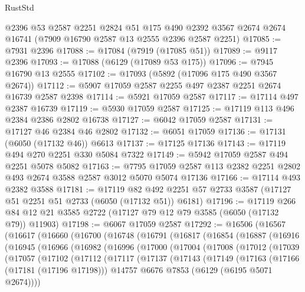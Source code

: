 \begin{lexlean}{RustStd}
\begin{coremodule}
    @2396
    @53
    @2587
    @2251
    @2824
    @51
    @175
    @490
    @2392
    @3567
    @2674
    @2674
    @16741
    (@7909 @16790 @2587 @13 @2555 @2396 @2587 @2251)
@17085 := @7931 @2396
@17088 := @17084 (@7919 (@17085 @51))
@17089 := @9117 @2396
@17093 := @17088 (@6129 (@17089 @53 @175))
@17096 := @7945 @16790 @13 @2555
@17102 := @17093 (@5892 (@17096 @175 @490 @3567 @2674))
@17112 := @5907 @17059 @2587 @2255 @497 @2387 @2251 @2674 @16739 @2587 @2398
@17114 := @5921 @17059 @2587
@17117 := @17114 @497 @2387 @16739
@17119 := @5930 @17059 @2587
@17125 := @17119 @113 @496 @2384 @2386 @2802 @16738
@17127 := @6042 @17059 @2587
@17131 := @17127 @46 @2384 @46 @2802
@17132 := @6051 @17059
@17136 := @17131 (@6050 (@17132 @46)) @6613
@17137 := @17125 @17136
@17143 := @17119 @494 @270 @2251 @330 @5084 @7322
@17149 := @5942 @17059 @2587 @494 @2251 @5078 @5082
@17163 := @7795 @17059 @2587 @113 @2382 @2251 @2802 @493 @2674 @3588 @2587 @3012 @5070 @5074 @17136
@17166 := @17114 @493 @2382 @3588
@17181 := @17119
    @82
    @492
    @2251
    @57
    @2733
    @3587
    (@17127 @51 @2251 @51 @2733 (@6050 (@17132 @51)) @6181)
@17196 := @17119 @266 @84 @12 @21 @3585 @2722 (@17127 @79 @12 @79 @3585 (@6050 (@17132 @79)) @11903)
@17198 := @6067 @17059 @2587
@17292 := @16506
    (@16567
      (@16617
        (@16660
          (@16700
            (@16748
              (@16791
                (@16817
                  (@16854
                    (@16887
                      (@16916
                        (@16945
                          (@16966
                            (@16982
                              (@16996
                                (@17000
                                  (@17004
                                    (@17008
                                      (@17012
                                        (@17039
                                          (@17057
                                            (@17102
                                              (@17112
                                                (@17117
                                                  (@17137
                                                    (@17143
                                                      (@17149
                                                        (@17163
                                                          (@17166 (@17181 (@17196 @17198)))
                                                          @14757
                                                          @6676
                                                          @7853
                                                          (@6129 (@6195 @5071 @2674))))

\end{coremodule}
\end{lexlean}
